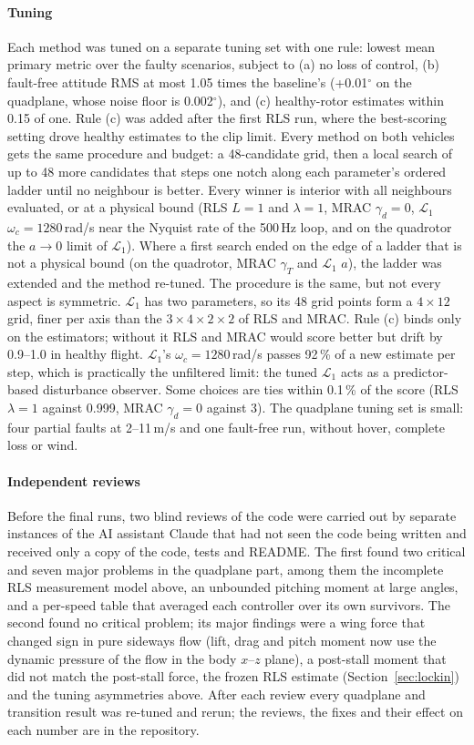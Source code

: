 \documentclass[preprint,12pt,a4paper]{elsarticle}
\begin{document}
\paragraph{Tuning} Each method was tuned on a separate tuning set with one rule: lowest mean primary metric over the faulty
scenarios, subject to (a) no loss of control, (b) fault-free attitude RMS at most 1.05 times the baseline's (+0.01$^\circ$ on the
quadplane, whose noise floor is 0.002$^\circ$), and (c) healthy-rotor estimates within 0.15 of one. Rule (c) was added after the first
RLS run, where the best-scoring setting drove healthy estimates to the clip limit. Every method on both vehicles gets the same procedure and budget: a 48-candidate grid, then a local search of up to 48 more
candidates that steps one notch along each parameter's ordered ladder until no neighbour is better. Every winner is interior with all
neighbours evaluated, or at a physical bound (RLS $L = 1$ and $\lambda = 1$, MRAC $\gamma_d = 0$, $\mathcal{L}_1$ $\omega_c = 1280$\,rad/s near
the Nyquist rate of the 500\,Hz loop, and on the quadrotor the $a \to 0$ limit of $\mathcal{L}_1$). Where a first search ended on the
edge of a ladder that is not a physical bound (on the quadrotor, MRAC $\gamma_T$ and $\mathcal{L}_1$ $a$), the ladder was extended and
the method re-tuned. The procedure is the same, but not every aspect is symmetric. $\mathcal{L}_1$ has two parameters, so its 48 grid points
form a $4\times12$ grid, finer per axis than the $3\times4\times2\times2$ of RLS and MRAC. Rule (c) binds only on the estimators; without it
RLS and MRAC would score better but drift by 0.9--1.0 in healthy flight. $\mathcal{L}_1$'s $\omega_c = 1280$\,rad/s passes 92\,\% of a new
estimate per step, which is practically the unfiltered limit: the tuned $\mathcal{L}_1$ acts as a predictor-based disturbance observer.
Some choices are ties within 0.1\,\% of the score (RLS $\lambda = 1$ against 0.999, MRAC $\gamma_d = 0$ against 3). The quadplane tuning set
is small: four partial faults at 2--11\,m/s and one fault-free run, without hover, complete loss or wind.

\paragraph{Independent reviews} Before the final runs, two blind reviews of the code were carried out by separate instances of the AI assistant
Claude that had not seen the code being written and received only a copy of the code, tests and README. The first found two critical and seven major problems in the quadplane part, among them the incomplete RLS
measurement model above, an unbounded pitching moment at large angles, and a per-speed table that averaged each controller over its own
survivors. The second found no critical problem; its major findings were a wing force that changed sign in pure sideways flow (lift,
drag and pitch moment now use the dynamic pressure of the flow in the body $x$--$z$ plane), a post-stall moment that did not match the
post-stall force, the frozen RLS estimate (Section~\ref{sec:lockin}) and the tuning asymmetries above. After each review every quadplane and
transition result was re-tuned and rerun; the reviews, the fixes and their effect on each number are in the repository.
\end{document}
